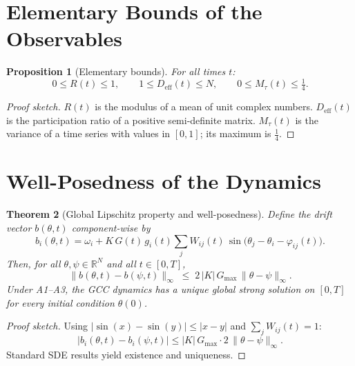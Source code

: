 \documentclass[11pt,a4paper]{article}
\theoremstyle{plain}
\newtheorem{theorem}{Theorem}[section]
\newtheorem{proposition}[theorem]{Proposition}
\theoremstyle{definition}
\theoremstyle{remark}
\newcommand{\Deff}{D_{\mathrm{eff}}}
\newcommand{\Mtau}{M_{\tau}}
\newcommand{\Gmax}{G_{\max}}
\begin{document}
\section{Elementary Bounds of the Observables}

\begin{proposition}[Elementary bounds]
\label{prop:schranken}
For all times $t$:
\begin{equation}
0 \leq R(t) \leq 1, \qquad
1 \leq \Deff(t) \leq N, \qquad
0 \leq \Mtau(t) \leq \tfrac{1}{4}.
\end{equation}
\end{proposition}

\begin{proof}[Proof sketch]
$R(t)$ is the modulus of a mean of unit complex numbers. $\Deff(t)$ is the participation ratio of a positive semi-definite matrix. $\Mtau(t)$ is the variance of a time series with values in $[0,1]$; its maximum is $\frac{1}{4}$.
\end{proof}

\section{Well-Posedness of the Dynamics}

\begin{theorem}[Global Lipschitz property and well-posedness]
\label{satz:lipschitz}
Define the drift vector $b(\theta,t)$ component-wise by
\begin{equation}
b_i(\theta,t) = \omega_i + K\,G(t)\,g_i(t)\sum_j W_{ij}(t)\,\sin\!\bigl(\theta_j - \theta_i - \varphi_{ij}(t)\bigr).
\end{equation}
Then, for all $\theta,\psi \in \mathbb{R}^N$ and all $t \in [0,T]$,
\begin{equation}
\label{eq:lipschitz}
\|b(\theta,t) - b(\psi,t)\|_{\infty} \;\leq\; 2\,|K|\,\Gmax\,\|\theta - \psi\|_{\infty}.
\end{equation}
Under \textup{A1--A3}, the GCC dynamics has a unique global strong solution on $[0,T]$ for every initial condition $\theta(0)$.
\end{theorem}

\begin{proof}[Proof sketch]
Using $|\sin(x) - \sin(y)| \leq |x - y|$ and $\sum_j W_{ij}(t) = 1$:
\begin{equation}
|b_i(\theta,t) - b_i(\psi,t)| \leq |K|\,\Gmax \cdot 2\,\|\theta - \psi\|_{\infty}.
\end{equation}
Standard SDE results yield existence and uniqueness.
\end{proof}
\end{document}
